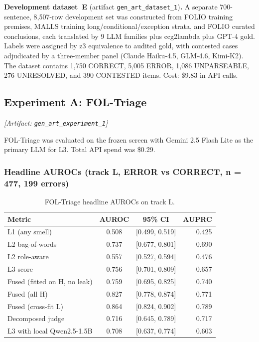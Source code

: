 \documentclass[11pt,letterpaper]{article}
\begin{document}
\textbf{Development dataset~E} (artifact \texttt{gen\_art\_dataset\_1})\textbf{.} A separate 700-sentence, 8,507-row development set was constructed from FOLIO training premises, MALLS training long/conditional/exception strata, and FOLIO curated conclusions, each translated by 9 LLM families plus ccg2lambda plus GPT-4 gold. Labels were assigned by z3 equivalence to audited gold, with contested cases adjudicated by a three-member panel (Claude Haiku-4.5, GLM-4.6, Kimi-K2). The dataset contains 1,750 CORRECT, 5,005 ERROR, 1,086 UNPARSEABLE, 276 UNRESOLVED, and 390 CONTESTED items. Cost: \$9.83 in API calls.

\subsection{Experiment A: FOL-Triage}
\label{sec:exp_a}
\noindent\textit{[Artifact: \texttt{gen\_art\_experiment\_1}]}

FOL-Triage was evaluated on the frozen screen with Gemini 2.5 Flash Lite as the primary LLM for L3. Total API spend was \$0.29.

\subsubsection{Headline AUROCs (track L, ERROR vs CORRECT, n = 477, 199 errors)}

\begin{table}[!htbp]
\centering
\caption{FOL-Triage headline AUROCs on track L.}
\label{tab:foltriage_headline}
\begin{tabular}{lccr}
\toprule
Metric & AUROC & 95\% CI & AUPRC \\
\midrule
L1 (any smell) & 0.508 & [0.499, 0.519] & 0.425 \\
L2 bag-of-words & 0.737 & [0.677, 0.801] & 0.690 \\
L2 role-aware & 0.557 & [0.527, 0.594] & 0.476 \\
L3 score & 0.756 & [0.701, 0.809] & 0.657 \\
Fused (fitted on H, no leak) & 0.759 & [0.695, 0.825] & 0.740 \\
Fused (all H) & 0.827 & [0.778, 0.874] & 0.771 \\
Fused (cross-fit L) & 0.864 & [0.824, 0.902] & 0.789 \\
Decomposed judge & 0.716 & [0.645, 0.789] & 0.717 \\
L3 with local Qwen2.5-1.5B & 0.708 & [0.637, 0.774] & 0.603 \\
\bottomrule
\end{tabular}
\end{table}
\end{document}
